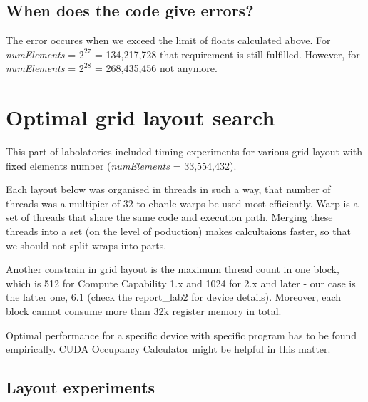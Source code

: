 \documentclass[12pt]{article}
\begin{document}
\subsection{When does the code give errors?}
The error occures when we exceed the limit of floats calculated above. For \textit{numElements} =  $2^{\text{27}}$ = 134,217,728 that requirement is still fulfilled. However, for \textit{numElements} =  $2^{\text{28}}$ = 268,435,456 not anymore.
\section{Optimal grid layout search} 
This part of labolatories included timing experiments for various grid layout with fixed elements number (\textit{numElements} = 33,554,432).

Each layout below was organised in threads in such a way, that number of threads was a multipier of 32 to ebanle warps be used most efficiently. Warp is a set of threads that share the same code and execution path. Merging these threads into a set (on the level of poduction) makes calcultaions faster, so that we should not split wraps into parts.

Another constrain in grid layout is the maximum thread count in one block, which is 512 for Compute Capability 1.x and 1024 for 2.x and later - our case is the latter one, 6.1 (check the report\_lab2 for device details). Moreover, each block cannot consume more than 32k register memory in total.

Optimal performance for a specific device with specific program has to be found empirically. CUDA Occupancy Calculator might be helpful in this matter.
\subsection{Layout experiments}
\end{document}

